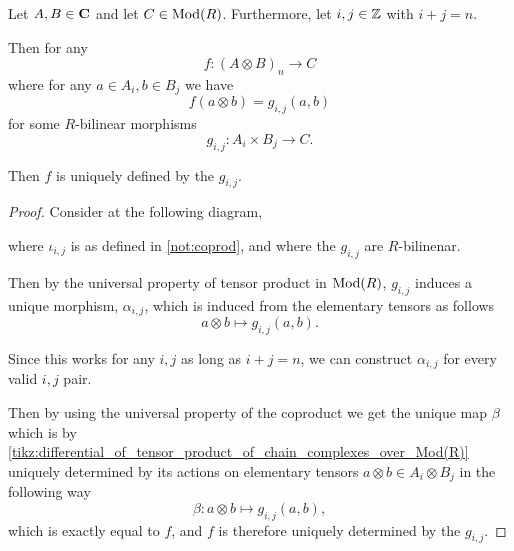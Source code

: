 \begin{lemma}
    \label{lem:map_out_of_tensor_unique}
    Let \( A, B \in \operatorname{\mathbf{C}} \) and let \( C \in \operatorname{Mod}(R) \). Furthermore, let \( i, j \in {\mathbb{Z}} \) with \( i + j = n \).

    Then for any
    \[
        f: (A \otimes B)_n \to C
    \]
    where for any \( a \in A_i, b \in B_j \) we have
    \[
        f(a \otimes b) = g_{i, j}(a, b)
    \]
    for some \( R \)-bilinear morphisms
    \[
        g_{i, j}: A_i \times B_j \to C.
    \]

    Then \( f \) is uniquely defined by the \( g_{i, j} \).
\end{lemma}
\begin{proof}
    Consider at the following diagram,
    \begin{diagramlabel}[\label{tikz:differential_of_tensor_product_of_chain_complexes_over_Mod(R)}]
    \end{diagramlabel}
    where \( \iota_{i, j} \) is as defined in \autoref{not:coprod}, and where the \( g_{i, j} \) are \( R \)-bilinenar.

    Then by the universal property of tensor product in \( \operatorname{Mod}(R) \), \( g_{i, j} \) induces a unique morphism, \( \alpha_{i, j} \), which is induced from the elementary tensors as follows
    \[
        a \otimes b \mapsto g_{i, j}(a, b).
    \]

    Since this works for any \( i, j \) as long as \( i + j = n \), we can construct \( \alpha_{i, j} \) for every valid \( i, j \) pair.

    Then by using the universal property of the coproduct we get the unique map \( \beta \) which is by \autoref{tikz:differential_of_tensor_product_of_chain_complexes_over_Mod(R)} uniquely determined by its actions on elementary tensors \( a \otimes b \in A_i \otimes B_j \) in the following way
    \[
        \beta: a \otimes b \mapsto g_{i, j}(a, b),
    \]
    which is exactly equal to \( f \), and \( f \) is therefore uniquely determined by the \( g_{i, j} \).
\end{proof}

